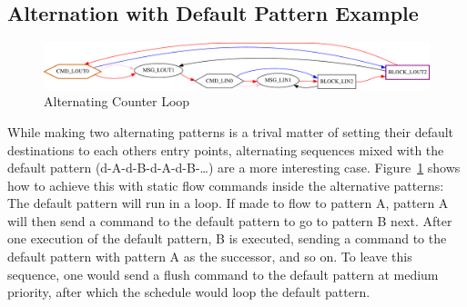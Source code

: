 \subsection{Alternation with Default Pattern Example}
%
\begin{figure}[H]
   \centering
   \def\svgwidth{1.0\textwidth}
   \includegraphics*[width=1.0\textwidth,keepaspectratio]{Figures/excntloop}
   \caption{Alternating Counter Loop}
   \label{fig:excntloop-alternate}
\end{figure}


While making two alternating patterns is a trival matter of setting their default destinations to each others entry points,
alternating sequences mixed with the default pattern (d-A-d-B-d-A-d-B-\dots) are a more interesting case.
Figure~\ref{fig:excntloop-alternate} shows how to achieve this with static flow commands inside the alternative patterns:
The default pattern will run in a loop. If made to flow to pattern A, pattern A will then send a command to the default pattern to go to pattern B next.
After one execution of the default pattern, B is executed, sending a command to the default pattern with pattern A as the successor, and so on.
To leave this sequence, one would send a flush command to the default pattern at medium priority, after which the schedule would loop the default pattern.
